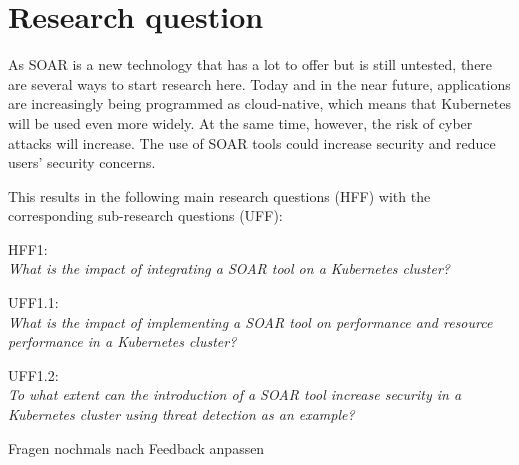 

\section{Research question} \label{cha:researchQuestion}

As SOAR is a new technology that has a lot to offer but is still untested, there are several ways to start research here. Today and in the near future, applications are increasingly being programmed as cloud-native, which means that Kubernetes will be used even more widely. At the same time, however, the risk of cyber attacks will increase. The use of SOAR tools could increase security and reduce users' security concerns.

This results in the following main research questions (HFF) with the corresponding sub-research questions (UFF):

HFF1:\\
\textit{What is the impact of integrating a SOAR tool on a Kubernetes cluster?}

UFF1.1:\\
\textit{What is the impact of implementing a SOAR tool on performance and resource performance in a Kubernetes cluster?}

UFF1.2:\\
\textit{To what extent can the introduction of a SOAR tool increase security in a Kubernetes cluster using threat detection as an example?}

Fragen nochmals nach Feedback anpassen
